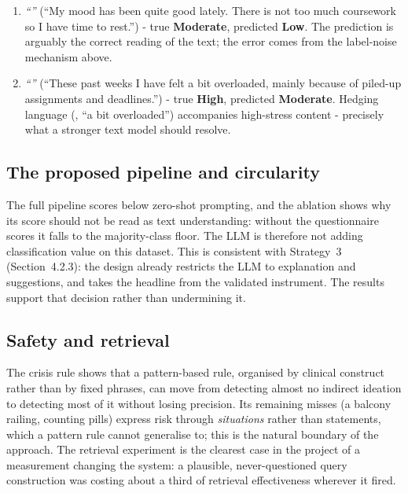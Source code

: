 \begin{enumerate}
	\item \textit{``''} (``My mood has been quite good lately. There is not too much coursework so I have time to rest.'') - true \textbf{Moderate}, predicted \textbf{Low}. The prediction is arguably the correct reading of the text; the error comes from the label-noise mechanism above.
	\item \textit{``''} (``These past weeks I have felt a bit overloaded, mainly because of piled-up assignments and deadlines.'') - true \textbf{High}, predicted \textbf{Moderate}. Hedging language (, ``a bit overloaded'') accompanies high-stress content - precisely what a stronger text model should resolve.
\end{enumerate}

\subsection{The proposed pipeline and circularity}
The full pipeline scores below zero-shot prompting, and the ablation shows why its score should not be read as text understanding: without the questionnaire scores it falls to the majority-class floor. The LLM is therefore not adding classification value on this dataset. This is consistent with Strategy~3 (Section~4.2.3): the design already restricts the LLM to explanation and suggestions, and takes the headline from the validated instrument. The results support that decision rather than undermining it.

\subsection{Safety and retrieval}
The crisis rule shows that a pattern-based rule, organised by clinical construct rather than by fixed phrases, can move from detecting almost no indirect ideation to detecting most of it without losing precision. Its remaining misses (a balcony railing, counting pills) express risk through \textit{situations} rather than statements, which a pattern rule cannot generalise to; this is the natural boundary of the approach. The retrieval experiment is the clearest case in the project of a measurement changing the system: a plausible, never-questioned query construction was costing about a third of retrieval effectiveness wherever it fired.


